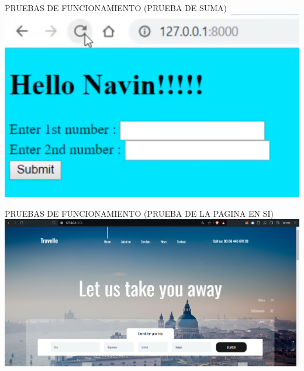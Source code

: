\documentclass{article}
\begin{document}
        \item PRUEBAS DE FUNCIONAMIENTO (PRUEBA DE SUMA)
        \newline\newline\newline
        \includegraphics[width=1\textwidth,keepaspectratio]{IMAGENES/Prueba(suma de numeros).png}

        \item PRUEBAS DE FUNCIONAMIENTO (PRUEBA DE LA PAGINA EN SI)
        \newline\newline\newline
        \includegraphics[width=1\textwidth,keepaspectratio]{IMAGENES/prueba(html-css).png}
\end{document}
